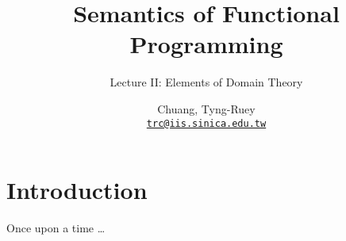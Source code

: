 \title{Semantics of Functional Programming}
\subtitle{Lecture II: Elements of Domain Theory}
\author[T.-R. Chuang]{Chuang, Tyng-Ruey\\
  \href{mailto:trc@iis.sinica.edu.tw}{\texttt{trc@iis.sinica.edu.tw}}}

\frame{\maketitle}
\section{Introduction}  
\begin{frame}
  Once upon a time \dots 
\end{frame}

